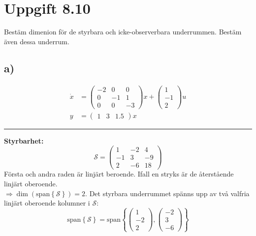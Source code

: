 \documentclass[12pt]{article}
\newcommand{\sspan}[1]{\mathrm{span}\left\{#1\right\}}
\newcommand{\qline}{\hrule \vspace*{10pt}}
\begin{document}
\section*{Uppgift 8.10}
Bestäm dimenion för de styrbara och icke-observerbara underrummen. Bestäm även dessa underrum.

\subsection*{a)}
\begin{align*}
  \dot{x} &=
            \begin{pmatrix}
              -2 & 0 & 0 \\
              0 & -1 & 1 \\
              0 & 0 & -3
            \end{pmatrix}x +
                      \begin{pmatrix}
                        1 \\
                        -1 \\
                        2
                      \end{pmatrix}u \\
  y &=
      \begin{pmatrix}
        1 & 3 & 1.5
      \end{pmatrix}x
\end{align*}
\qline
\textbf{Styrbarhet:}
\[\mathcal{S} =
\begin{pmatrix}
  1 & -2 & 4 \\
  -1 & 3 & -9 \\
  2 & -6 & 18
\end{pmatrix}\]
Första och andra raden är linjärt beroende. Ifall en stryks är de återstående linjärt oberoende.\\
$\Rightarrow \dim{(\sspan{\mathcal{S}})} = 2$.
Det styrbara underrummet spänns upp av två valfria linjärt oberoende kolumner i $\mathcal{S}$:
\begin{equation*}
  \sspan{\mathcal{S}} = \sspan{
    \begin{pmatrix}
      1 \\
      -2 \\
      2
    \end{pmatrix},
    \begin{pmatrix}
      -2 \\
      3 \\
      -6
    \end{pmatrix}}
\end{equation*}
\end{document}
